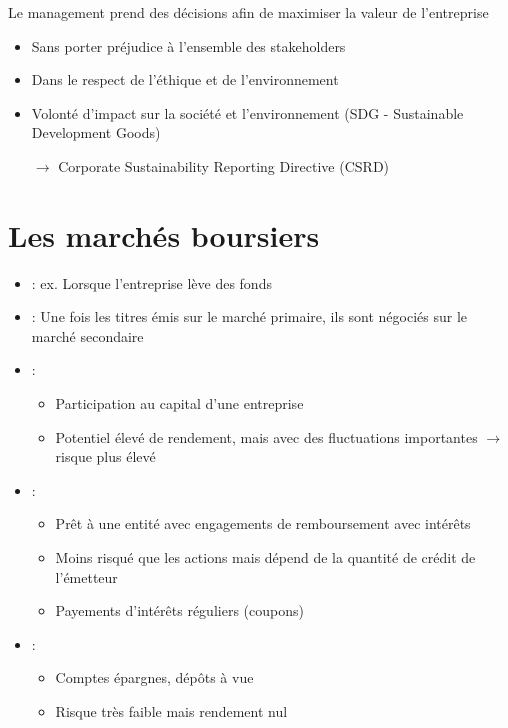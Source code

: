 Le management prend des décisions afin de maximiser la valeur de l'entreprise
\begin{itemize}
    \item Sans porter préjudice à l'ensemble des stakeholders
    \item Dans le respect de l'éthique et de l'environnement
    \item Volonté d'impact sur la société et l’environnement (SDG - Sustainable Development Goods)
    \item[$\rightarrow$] Corporate Sustainability Reporting Directive (CSRD)
\end{itemize}

\section{Les marchés boursiers}

\begin{itemize}
    \item {} : ex. Lorsque l'entreprise lève des fonds
    \item {} : Une fois les titres émis sur le marché primaire, ils sont négociés sur le marché secondaire
    \item {} :
    \begin{itemize}
        \item Participation au capital d'une entreprise
        \item Potentiel élevé de rendement, mais avec des fluctuations importantes $\rightarrow$ risque plus élevé
    \end{itemize}
    \item {} :
    \begin{itemize}
        \item Prêt à une entité avec engagements de remboursement avec intérêts
        \item Moins risqué que les actions mais dépend de la quantité de crédit de l'émetteur
        \item Payements d'intérêts réguliers (coupons)
    \end{itemize}
    \item {} : 
    \begin{itemize}
        \item Comptes épargnes, dépôts à vue
        \item Risque très faible mais rendement nul
    \end{itemize}
\end{itemize}

